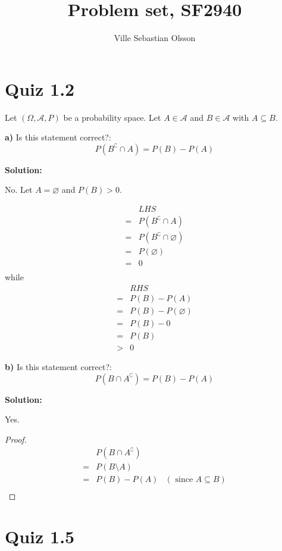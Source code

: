 \documentclass{article}
\title{Problem set, SF2940}
\author{Ville Sebastian Olsson}
\begin{document}
\maketitle

\section{Quiz 1.2}

Let \((\Omega, \mathcal{A}, P)\) be a probability space.
Let \(A\in \mathcal{A}\) and \(B\in \mathcal{A}\)
with \(A\subseteq B\).

\textbf{a)} Is this statement correct?:
\[P(B^\complement \cap A) = P(B)-P(A)\]

\textbf{Solution:}

No. Let \(A=\varnothing\) and \(P(B)>0\).

\begin{align*}
	 & LHS \\
	=& P(B^\complement \cap A) \\
	=& P(B^\complement \cap \varnothing) \\
	=& P(\varnothing) \\
	=& 0 \\
\end{align*}
while
\begin{align*}
	  & RHS \\
	 =& P(B)-P(A) \\
	 =& P(B)-P(\varnothing) \\
	 =& P(B)-0 \\
	 =& P(B) \\
	 >& 0
\end{align*}

\textbf{b)} Is this statement correct?:
\[P(B \cap A^\complement) = P(B)-P(A)\]

\textbf{Solution:}

Yes.
\begin{proof}
\begin{align*}
	 & P(B\cap A^\complement) \\
	=& P(B\setminus A) \\
	=& P(B)-P(A) & (\text{ since }A\subseteq B) \\
\end{align*}
\end{proof}

\section{Quiz 1.5}
\end{document}
